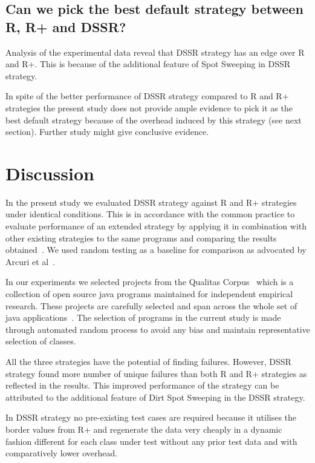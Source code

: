 \documentclass[conference]{IEEEtran}
\begin{document}
\subsection{Can we pick the best default strategy between R, R+ and DSSR?}

Analysis of the experimental data reveal that DSSR strategy has an edge over R and R+. This is because of the additional feature of Spot Sweeping in DSSR strategy.

In spite of the better performance of DSSR strategy compared to R and R+ strategies the present study does not provide ample evidence to pick it as the best default strategy because of the overhead induced by this strategy (see next section). Further study might give conclusive evidence. 





\section{Discussion}\label{sec:discussion}
In the present study we evaluated DSSR strategy against R and R+ strategies under identical conditions. This is in accordance with the common practice to evaluate performance of an extended strategy by applying it in combination with other existing strategies to the same programs and comparing the results obtained~\cite{Gutjahr1999, Hamlet1990}. We used random testing as a baseline for comparison as advocated by Arcuri et al~\cite{Arcuri2012}.

In our experiments we selected projects from the Qualitas Corpus~\cite{Tempero2010} which is a collection of open source java programs maintained for independent empirical research. These projects are carefully selected and span across the whole set of java applications~\cite{Oriol2012, Tempero2010a}. The selection of programs in the current study is made through automated random process to avoid any bias and maintain representative selection of classes. 

All the three strategies have the potential of finding failures. However, DSSR strategy found more number of unique failures than both R and R+ strategies as reflected in the results. This improved performance of the strategy can be attributed to the additional feature of Dirt Spot Sweeping in the DSSR strategy.
 
In DSSR strategy no pre-existing test cases are required because it utilises the border values from R+ and regenerate the data very cheaply in a dynamic fashion different for each class under test without any prior test data and with comparatively lower overhead. 
 
\end{document}

